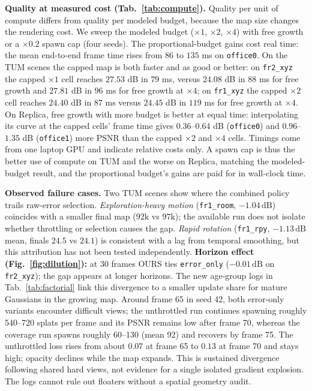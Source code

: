 \textbf{Quality at measured cost (Tab.~\ref{tab:compute}).}
Quality per unit of compute differs from quality per modeled budget, because the map size changes the rendering cost. We sweep the modeled budget ($\times1$, $\times2$, $\times4$) with free growth or a $\times0.2$ spawn cap (four seeds). The proportional-budget gains cost real time: the mean end-to-end frame time rises from $86$ to $135$ ms on \texttt{office0}. On the TUM scenes the capped map is both faster and as good or better: on \texttt{fr2\_xyz} the capped $\times1$ cell reaches $27.53$ dB in $79$ ms, versus $24.08$ dB in $88$ ms for free growth and $27.81$ dB in $96$ ms for free growth at $\times4$; on \texttt{fr1\_xyz} the capped $\times2$ cell reaches $24.40$ dB in $87$ ms versus $24.45$ dB in $119$ ms for free growth at $\times4$. On Replica, free growth with more budget is better at equal time: interpolating its curve at the capped cells' frame time gives $0.36$--$0.64$ dB (\texttt{office0}) and $0.96$--$1.35$ dB (\texttt{office1}) more PSNR than the capped $\times2$ and $\times4$ cells. Timings come from one laptop GPU and indicate relative costs only. A spawn cap is thus the better use of compute on TUM and the worse on Replica, matching the modeled-budget result, and the proportional budget's gains are paid for in wall-clock time.


\textbf{Observed failure cases.} Two TUM scenes show where the combined policy trails raw-error selection.
\textit{Exploration-heavy motion} (\texttt{fr1\_room}, $-1.04\,\mathrm{dB}$) coincides with a smaller final map ($92\mathrm{k}$ vs $97\mathrm{k}$); the available run does not isolate whether throttling or selection causes the gap.
\textit{Rapid rotation} (\texttt{fr1\_rpy}, $-1.13\,\mathrm{dB}$ mean, finals $24.5$ vs $24.1$) is consistent with a lag from temporal smoothing, but this attribution has not been tested independently.
\textbf{Horizon effect (Fig.~\ref{fig:dilution}):} at 30 frames OURS ties \texttt{error\_only} ($-0.01\,\mathrm{dB}$ on \texttt{fr2\_xyz}); the gap appears at longer horizons. The new age-group logs in Tab.~\ref{tab:factorial} link this divergence to a smaller update share for mature Gaussians in the growing map.
Around frame 65 in seed 42, both error-only variants encounter difficult views; the unthrottled run continues spawning roughly 540--720 splats per frame and its PSNR remains low after frame 70, whereas the coverage run spawns roughly 60--130 (mean 92) and recovers by frame 75. The unthrottled loss rises from about $0.07$ at frame 65 to $0.13$ at frame 70 and stays high; opacity declines while the map expands. This is sustained divergence following shared hard views, not evidence for a single isolated gradient explosion. The logs cannot rule out floaters without a spatial geometry audit.


